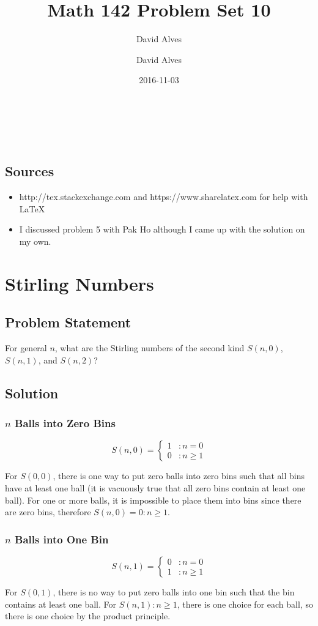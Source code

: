 \documentclass[12pt]{article}
\author{David Alves}
\title{Math 142 Problem Set 10}
\author{David Alves}
\date{2016-11-03}
\newcommand{\ProblemStatement}[1]{
\subsection*{Problem Statement}
#1
\subsection*{Solution}
}
\begin{document}

\begin{center}
\large \thetitle \\
\theauthor \\
\thedate
\end{center}

\subsection*{Sources}

    \begin{itemize}
    \item http://tex.stackexchange.com and https://www.sharelatex.com for help with \LaTeX
    \item I discussed problem 5 with Pak Ho although I came up with the solution on my own.
    \end{itemize}

\section{Stirling Numbers}
\ProblemStatement{
For general $n$, what are the Stirling numbers of the second kind $S(n,0)$, $S(n,1)$, and $S(n,2)$?
}

\subsubsection{$n$ Balls into Zero Bins}
\[
    S(n, 0) = 
    \begin{cases}
        1&: n=0\\
        0&: n \ge 1
    \end{cases}
\]

For $S(0,0)$, there is one way to put zero balls into zero bins such that all bins have at least one ball (it is vacuously true that all zero bins contain at least one ball). For one or more balls, it is impossible to place them into bins since there are zero bins, therefore $S(n, 0) = 0: n \ge 1$.

\subsubsection{$n$ Balls into One Bin}
\[
    S(n, 1) = 
    \begin{cases}
        0&: n=0\\
        1&: n \ge 1
    \end{cases}
\]

For $S(0, 1)$, there is no way to put zero balls into one bin such that the bin contains at least one ball. For $S(n, 1): n \ge 1$, there is one choice for each ball, so there is one choice by the product principle.
\end{document}
